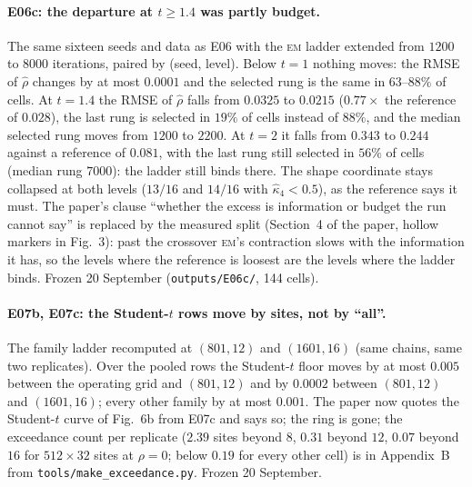 \paragraph{E06c: the departure at $t\ge1.4$ was partly budget.} The same sixteen seeds and data as E06 with the \textsc{em} ladder extended from $1200$ to $8000$ iterations, paired by (seed, level). Below $t=1$ nothing moves: the RMSE of $\hat\rho$ changes by at most $0.0001$ and the selected rung is the same in $63$--$88\%$ of cells. At $t=1.4$ the RMSE of $\hat\rho$ falls from $0.0325$ to $0.0215$ ($0.77\times$ the reference of $0.028$), the last rung is selected in $19\%$ of cells instead of $88\%$, and the median selected rung moves from $1200$ to $2200$. At $t=2$ it falls from $0.343$ to $0.244$ against a reference of $0.081$, with the last rung still selected in $56\%$ of cells (median rung $7000$): the ladder still binds there. The shape coordinate stays collapsed at both levels ($13/16$ and $14/16$ with $\hat\kappa_4<0.5$), as the reference says it must. The paper's clause ``whether the excess is information or budget the run cannot say'' is replaced by the measured split (Section~4 of the paper, hollow markers in Fig.~3): past the crossover \textsc{em}'s contraction slows with the information it has, so the levels where the reference is loosest are the levels where the ladder binds. Frozen 20 September (\texttt{outputs/E06c/}, 144 cells).

\paragraph{E07b, E07c: the Student-$t$ rows move by sites, not by ``all''.} The family ladder recomputed at $(801,12)$ and $(1601,16)$ (same chains, same two replicates). Over the pooled rows the Student-$t$ floor moves by at most $0.005$ between the operating grid and $(801,12)$ and by $0.0002$ between $(801,12)$ and $(1601,16)$; every other family by at most $0.001$. The paper now quotes the Student-$t$ curve of Fig.~6b from E07c and says so; the ring is gone; the exceedance count per replicate ($2.39$ sites beyond $8$, $0.31$ beyond $12$, $0.07$ beyond $16$ for $512\times32$ sites at $\rho=0$; below $0.19$ for every other cell) is in Appendix~B from \texttt{tools/make\_exceedance.py}. Frozen 20 September.

